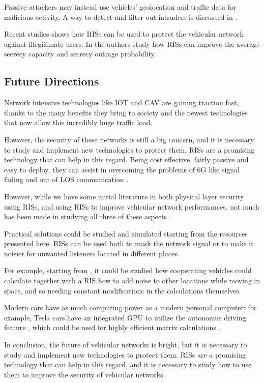 \documentclass[conference]{IEEEtran}
\begin{document}
Passive attackers may instead use vehicles' geolocation and traffic data for malicious activity. A way to detect and filter out intruders is discussed in \cite{8474336}.

Recent studies shows how RISs can be used to protect the vehicular network against illegitimate users. In \cite{makarfi2020reconfigurableintelligentsurfacesenabledvehicular} the authors study how RISs can improve the average secrecy capacity and secrecy outrage probability.

\subsection{Future Directions}

Network intensive technologies like IOT and CAV are gaining traction fast, thanks to the many benefits they bring to society and the newest technologies that now allow this incredibly huge traffic load.

However, the security of these networks is still a big concern, and it is necessary to study and implement new technologies to protect them. RISs are a promising technology that can help in this regard. Being cost effective, fairly passive and easy to deploy, they can assist in overcoming the problems of 6G like signal fading and out of LOS communication \cite{8796365}.

However, while we have some initial literature in both physical layer security using RISs, and using RISs to improve vehicular network performances, not much has been made in studying all three of these aspects \cite{makarfi2020reconfigurableintelligentsurfacesenabledvehicular}.

Practical solutions could be studied and simulated starting from the resources presented here. RISs can be used both to mask the network signal or to make it noisier for unwanted listeners located in different places.

For example, starting from \cite{4543070}, it could be studied how cooperating vehicles could calculate together with a RIS how to add noise to other locations while moving in space, and so needing constant modifications in the calculations themselves.

Modern cars have as much computing power as a modern personal computer: for example, Tesla cars have an integrated GPU to utilize the autonomus driving feature \cite{10586734}, which could be used for highly efficient matrix calculations \cite{1011452699470}.

In conclusion, the future of vehicular networks is bright, but it is necessary to study and implement new technologies to protect them. RISs are a promising technology that can help in this regard, and it is necessary to study how to use them to improve the security of vehicular networks.



\end{document}
